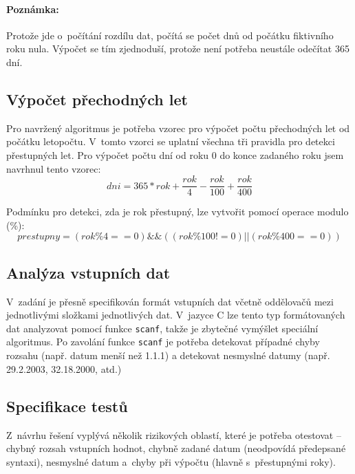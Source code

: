 \documentclass[12pt,a4paper,titlepage,final]{article}
\begin{document}
\paragraph*{Poznámka:} Protože jde o~počítání rozdílu dat, počítá se počet dnů
od počátku fiktivního roku nula. Výpočet se tím zjednoduší, protože není
potřeba neustále odečítat 365 dní.

\subsection{Výpočet přechodných let} Pro navržený algoritmus je potřeba vzorec
pro výpočet počtu přechodných let od počátku letopočtu. V~tomto vzorci se
uplatní všechna tři pravidla pro detekci přestupných let. Pro výpočet počtu dní
od roku 0 do konce zadaného roku jsem navrhnul tento vzorec:
\begin{equation}\label{eq:dni} dni = 365 * rok + \frac{rok}{4} -
\frac{rok}{100} + \frac{rok}{400} \end{equation}

Podmínku pro detekci, zda je rok přestupný, lze vytvořit pomocí operace modulo
(\%): 
\begin{equation}\label{eq:prestupny}
prestupny = (rok \% 4 == 0) \&\& ((rok \% 100 != 0) || (rok \% 400 == 0))
\end{equation}

\subsection{Analýza vstupních dat}

V~zadání je přesně specifikován formát vstupních dat včetně oddělovačů mezi
jednotlivými složkami jednotlivých dat.  V~jazyce C lze tento typ formátovaných
dat analyzovat pomocí funkce \texttt{scanf}, takže je zbytečné vymýšlet
speciální algoritmus. Po zavolání funkce \texttt{scanf} je potřeba detekovat
případné chyby rozsahu (např. datum menší než 1.1.1) a detekovat nesmyslné
datumy (např. 29.2.2003, 32.18.2000, atd.)

\subsection{Specifikace testů} \label{testy}

Z~návrhu řešení vyplývá několik rizikových oblastí, které je potřeba otestovat
-- chybný rozsah vstupních hodnot, chybně zadané datum (neodpovídá předepsané
syntaxi), nesmyslné datum a~chyby při výpočtu (hlavně s~přestupnými roky).
\end{document}
